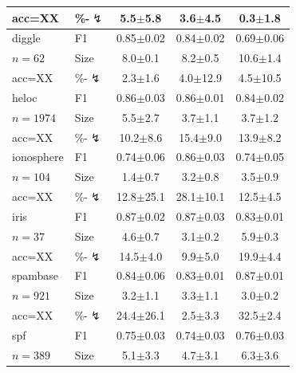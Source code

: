 \begin{tabular}{llccc}
acc=XX & \%-$\lightning$ & 5.5{\scriptsize$\pm$5.8} & 3.6{\scriptsize$\pm$4.5} & 0.3{\scriptsize$\pm$1.8} \\
\midrule
diggle & F1 & 0.85{\scriptsize$\pm$0.02} & 0.84{\scriptsize$\pm$0.02} & 0.69{\scriptsize$\pm$0.06} \\
$n=62$ & Size & 8.0{\scriptsize$\pm$0.1} & 8.2{\scriptsize$\pm$0.5} & 10.6{\scriptsize$\pm$1.4} \\
acc=XX & \%-$\lightning$ & 2.3{\scriptsize$\pm$1.6} & 4.0{\scriptsize$\pm$12.9} & 4.5{\scriptsize$\pm$10.5} \\
\midrule
heloc & F1 & 0.86{\scriptsize$\pm$0.03} & 0.86{\scriptsize$\pm$0.01} & 0.84{\scriptsize$\pm$0.02} \\
$n=1974$ & Size & 5.5{\scriptsize$\pm$2.7} & 3.7{\scriptsize$\pm$1.1} & 3.7{\scriptsize$\pm$1.2} \\
acc=XX & \%-$\lightning$ & 10.2{\scriptsize$\pm$8.6} & 15.4{\scriptsize$\pm$9.0} & 13.9{\scriptsize$\pm$8.2} \\
\midrule
ionosphere & F1 & 0.74{\scriptsize$\pm$0.06} & 0.86{\scriptsize$\pm$0.03} & 0.74{\scriptsize$\pm$0.05} \\
$n=104$ & Size & 1.4{\scriptsize$\pm$0.7} & 3.2{\scriptsize$\pm$0.8} & 3.5{\scriptsize$\pm$0.9} \\
acc=XX & \%-$\lightning$ & 12.8{\scriptsize$\pm$25.1} & 28.1{\scriptsize$\pm$10.1} & 12.5{\scriptsize$\pm$4.5} \\
\midrule
iris & F1 & 0.87{\scriptsize$\pm$0.02} & 0.87{\scriptsize$\pm$0.03} & 0.83{\scriptsize$\pm$0.01} \\
$n=37$ & Size & 4.6{\scriptsize$\pm$0.7} & 3.1{\scriptsize$\pm$0.2} & 5.9{\scriptsize$\pm$0.3} \\
acc=XX & \%-$\lightning$ & 14.5{\scriptsize$\pm$4.0} & 9.9{\scriptsize$\pm$5.0} & 19.9{\scriptsize$\pm$4.4} \\
\midrule
spambase & F1 & 0.84{\scriptsize$\pm$0.06} & 0.83{\scriptsize$\pm$0.01} & 0.87{\scriptsize$\pm$0.01} \\
$n=921$ & Size & 3.2{\scriptsize$\pm$1.1} & 3.3{\scriptsize$\pm$1.1} & 3.0{\scriptsize$\pm$0.2} \\
acc=XX & \%-$\lightning$ & 24.4{\scriptsize$\pm$26.1} & 2.5{\scriptsize$\pm$3.3} & 32.5{\scriptsize$\pm$2.4} \\
\midrule
spf & F1 & 0.75{\scriptsize$\pm$0.03} & 0.74{\scriptsize$\pm$0.03} & 0.76{\scriptsize$\pm$0.03} \\
$n=389$ & Size & 5.1{\scriptsize$\pm$3.3} & 4.7{\scriptsize$\pm$3.1} & 6.3{\scriptsize$\pm$3.6} \\

\end{tabular}
